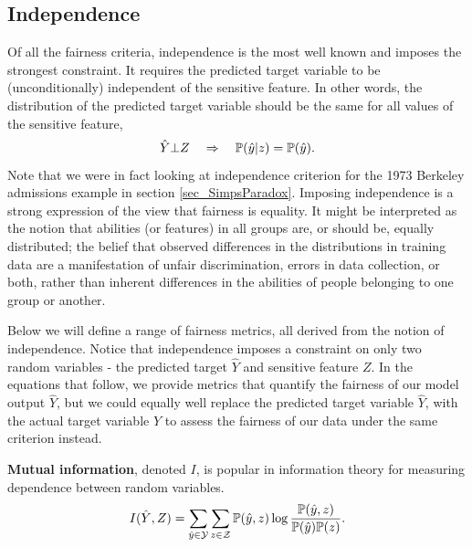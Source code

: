 \subsection{Independence}

Of all the fairness criteria, independence is the most well known and imposes the strongest constraint. It requires the predicted target variable to be (unconditionally) independent of the sensitive feature. In other words, the distribution of the predicted target variable should be the same for all values of the sensitive feature,
\[
\hat{Y} \bot Z \quad \Rightarrow \quad \mathbb{P}(\hat{y}|z) = \mathbb{P}(\hat{y}).
\]
Note that we were in fact looking at independence criterion for the 1973 Berkeley admissions example in section \ref{sec_SimpsParadox}.
Imposing independence is a strong expression of the view that fairness is equality. It might be interpreted as the notion that abilities (or features) in all groups are, or should be, equally distributed; the belief that observed differences in the distributions in training data are a manifestation of unfair discrimination, errors in data collection, or both, rather than inherent differences in the abilities of people belonging to one group or another.

Below we will define a range of fairness metrics, all derived from the notion of independence. Notice that independence imposes a constraint on only two random variables - the predicted target $\hat{Y}$ and sensitive feature $Z$. In the equations that follow, we provide metrics that quantify the fairness of our model output $\hat{Y}$, but we could equally well replace the predicted target variable $\hat{Y}$, with the actual target variable $Y$ to assess the fairness of our data under the same criterion instead.

\textbf{Mutual information}, denoted $I$, is popular in information theory for measuring dependence between random variables.
\begin{equation} \label{eqn_MutualInfo}
I(\hat{Y},Z) = \sum_{\hat{y} \in \mathcal{Y}} \sum_{z \in \mathcal{Z}}
\mathbb{P}(\hat{y},z) \log \frac{\mathbb{P}(\hat{y},z)}{\mathbb{P}(\hat{y})\mathbb{P}(z)}.
\end{equation}


